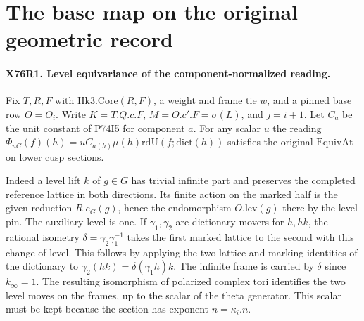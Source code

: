 \section{The base map on the original geometric record}

\paragraph{X76R1. Level equivariance of the component-normalized reading.}
Fix $T,R,F$ with $\mathrm{Hk3.Core}(R,F)$, a weight and frame tie $w$,
and a pinned base row $O=O_i$. Write $K=T.Q.c.F$,
$M=O.c'.F=\sigma(L)$, and $j=i+1$. Let $C_a$ be the unit
constant of P74I5 for component $a$. For any scalar $u$ the
reading $\Phi_{uC}(f)(h)=u C_{a(h)}\mu(h)
\mathrm{rdU}(f;\mathrm{dict}(h))$ satisfies the original
$\mathrm{EquivAt}$ on lower cusp sections.

Indeed a level lift $k$ of $g\in G$ has trivial infinite part and
preserves the completed reference lattice in both directions. Its
finite action on the marked half is the given reduction
$R.e_G(g)$, hence the endomorphism $O.\mathrm{lev}(g)$ there by the
level pin. The auxiliary level is one. If $\gamma_1,\gamma_2$ are
dictionary movers for $h,hk$, the rational isometry
$\delta=\gamma_2\gamma_1^{-1}$ takes the first marked lattice
to the second with this change of level. This follows by applying
the two lattice and marking identities of the dictionary to
$\gamma_2(hk)=\delta(\gamma_1h)k$. The infinite frame is carried
by $\delta$ since $k_\infty=1$. The resulting isomorphism of
polarized complex tori identifies the two level moves on the
frames, up to the scalar of the theta generator. This scalar
must be kept because the section has exponent $n=\kappa_i.n$.

